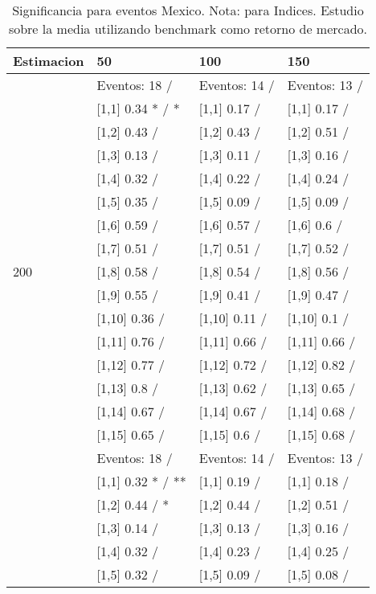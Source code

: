 \begin{table}

\caption{Significancia para eventos Mexico. Nota: para Indices. Estudio sobre la media utilizando benchmark como retorno de mercado.}
\centering
\begin{tabular}[t]{llll}
\toprule
Estimacion & 50 & 100 & 150\\
\midrule
 & Eventos:  18 / & Eventos:  14 / & Eventos:  13 /\\
 & {}[1,1] 0.34 * / * & {}[1,1] 0.17  / & {}[1,1] 0.17  /\\
 & {}[1,2] 0.43  / & {}[1,2] 0.43  / & {}[1,2] 0.51  /\\
 & {}[1,3] 0.13  / & {}[1,3] 0.11  / & {}[1,3] 0.16  /\\
 & {}[1,4] 0.32  / & {}[1,4] 0.22  / & {}[1,4] 0.24  /\\
\addlinespace
 & {}[1,5] 0.35  / & {}[1,5] 0.09  / & {}[1,5] 0.09  /\\
 & {}[1,6] 0.59  / & {}[1,6] 0.57  / & {}[1,6] 0.6  /\\
 & {}[1,7] 0.51  / & {}[1,7] 0.51  / & {}[1,7] 0.52  /\\
200 & {}[1,8] 0.58  / & {}[1,8] 0.54  / & {}[1,8] 0.56  /\\
 & {}[1,9] 0.55  / & {}[1,9] 0.41  / & {}[1,9] 0.47  /\\
\addlinespace
 & {}[1,10] 0.36  / & {}[1,10] 0.11  / & {}[1,10] 0.1  /\\
 & {}[1,11] 0.76  / & {}[1,11] 0.66  / & {}[1,11] 0.66  /\\
 & {}[1,12] 0.77  / & {}[1,12] 0.72  / & {}[1,12] 0.82  /\\
 & {}[1,13] 0.8  / & {}[1,13] 0.62  / & {}[1,13] 0.65  /\\
 & {}[1,14] 0.67  / & {}[1,14] 0.67  / & {}[1,14] 0.68  /\\
\addlinespace
 & {}[1,15] 0.65  / & {}[1,15] 0.6  / & {}[1,15] 0.68  /\\
 & Eventos:  18 / & Eventos:  14 / & Eventos:  13 /\\
 & {}[1,1] 0.32 * / ** & {}[1,1] 0.19  / & {}[1,1] 0.18  /\\
 & {}[1,2] 0.44  / * & {}[1,2] 0.44  / & {}[1,2] 0.51  /\\
 & {}[1,3] 0.14  / & {}[1,3] 0.13  / & {}[1,3] 0.16  /\\
\addlinespace
 & {}[1,4] 0.32  / & {}[1,4] 0.23  / & {}[1,4] 0.25  /\\
 & {}[1,5] 0.32  / & {}[1,5] 0.09  / & {}[1,5] 0.08  /\\

\end{tabular}
\end{table}
